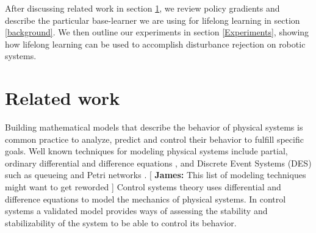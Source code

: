 \documentclass{aamas2016}
\newcommand{\note}[3]{{\color{#2} [ \ding{42} \textbf{#1:} {\small #3} ]}}
\newcommand{\comJames}[1]{\note{James}{magenta}{#1}}
\begin{document}
After discussing related work in section \ref{related}, we review policy gradients and describe the particular base-learner we are using for lifelong learning in  section \ref{background}. We then outline our experiments in section \ref{Experiments}, showing how lifelong learning can be used to accomplish disturbance rejection on robotic systems.







\section{Related work}\label{related}

Building mathematical models that describe the behavior of physical systems is common practice to analyze, predict and 
control their behavior to fulfill specific goals. Well known techniques for modeling physical systems include partial, ordinary
differential and difference equations \cite{Khalil-2002,Nise-2010}, and Discrete Event Systems (DES) such as queueing and Petri networks 
\cite{Cassandras-2008,Luna-2015,Urgaonkar-2007}.\comJames{This list of modeling techniques might want to get reworded}
Control systems theory uses differential and difference equations to model the mechanics of physical systems. In control systems
a validated model provides ways of assessing the stability and stabilizability of the system to be able to control its behavior.
\end{document}
